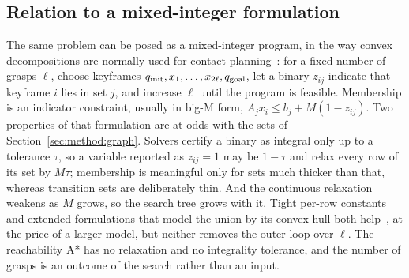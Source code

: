 \subsection{Relation to a mixed-integer formulation}
\label{sec:method:miqp}
The same problem can be posed as a mixed-integer program, in the way convex
decompositions are normally used for contact
planning~\cite{deits2014footstep}: for a fixed number of grasps $\ell$, choose
keyframes $q_{\mathrm{init}},x_1,\dots,x_{2\ell},q_{\mathrm{goal}}$, let a binary $z_{ij}$ indicate
that keyframe $i$ lies in set $j$, and increase $\ell$ until the program is
feasible. Membership is an indicator constraint, usually in big-M form,
$A_jx_i\le b_j+M(1-z_{ij})$. Two properties of that formulation are at odds
with the sets of Section~\ref{sec:method:graph}. Solvers certify a binary as
integral only up to a tolerance $\tau$, so a variable reported as $z_{ij}=1$
may be $1-\tau$ and relax every row of its set by $M\tau$; membership is
meaningful only for sets much thicker than that, whereas transition sets are
deliberately thin. And the continuous relaxation weakens as $M$ grows, so the
search tree grows with it. Tight per-row constants and extended formulations
that model the union by its convex hull both help~\cite{vielma2015mixed}, at
the price of a larger model, but neither removes the outer loop over $\ell$.
The reachability A* has no relaxation and no integrality tolerance, and the
number of grasps is an outcome of the search rather than an input.

